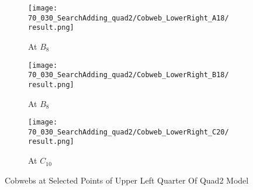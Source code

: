 \begin{figure}
    \centering
    \begin{subfigure}{0.3\textwidth}
        \centering
        \texttt{[image: 70\_030\_SearchAdding\_quad2/Cobweb\_LowerRight\_A18/result.png]}
        \caption{At $B_{8}$}
    \end{subfigure}
    \begin{subfigure}{0.3\textwidth}
        \centering
        \texttt{[image: 70\_030\_SearchAdding\_quad2/Cobweb\_LowerRight\_B18/result.png]}
        \caption{At $B_{8}$}
    \end{subfigure}
    \begin{subfigure}{0.3\textwidth}
        \centering
        \texttt{[image: 70\_030\_SearchAdding\_quad2/Cobweb\_LowerRight\_C20/result.png]}
        \caption{At $C_{10}$}
    \end{subfigure}
    \caption{Cobwebs at Selected Points of Upper Left Quarter Of Quad2 Model}
\end{figure}
